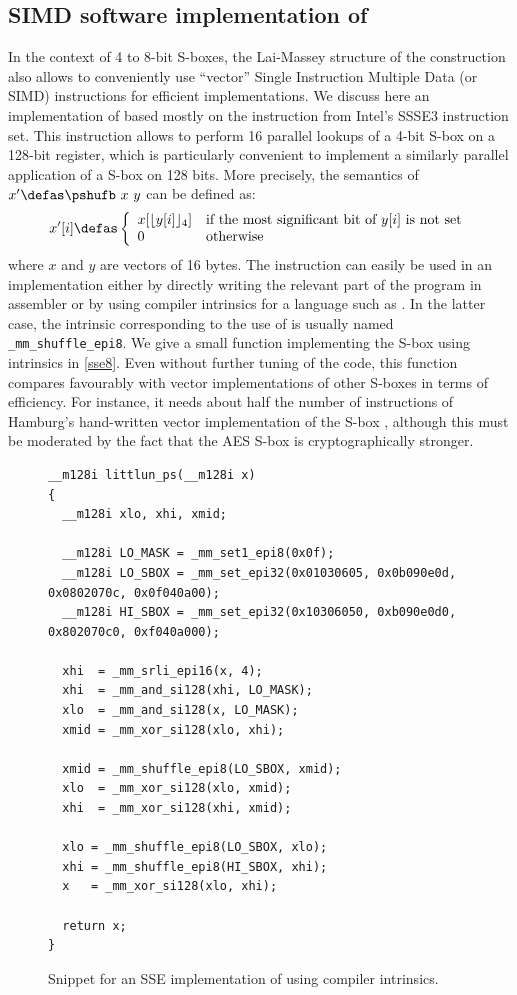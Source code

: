 \FloatBarrier

\subsection{SIMD software implementation of \littlunOne}
\label{sec:simdimplem}

In the context of 4 to 8-bit S-boxes, the Lai-Massey structure of the \littlun construction also allows to conveniently use ``vector'' Single Instruction Multiple Data (or SIMD) instructions for
efficient implementations. We discuss here an implementation of \littlunOne based mostly on the \pshufb instruction from Intel's SSSE3 instruction set. This instruction
allows to perform 16 parallel lookups of a 4-bit S-box on a 128-bit register, which is particularly convenient to implement a similarly parallel application of
a \littlun S-box on 128 bits. More precisely, the semantics of $x' \defas \pshufb~x~y$ can be defined as: 
\[
x'[i] \defas \left\{
				\begin{array}{ll}
				x[\lfloor y[i]\rfloor_4]  & \text{if the most significant bit of $y[i]$ is not set}\\
				0 & \text{otherwise}
				\end{array}
	    \right.
\]
where $x$ and $y$ are vectors of 16 bytes. The \pshufb instruction can easily be used in an implementation either by directly writing the relevant part of the program in assembler
or by using compiler intrinsics for a language such as \C. In the latter case, the intrinsic corresponding to the use of \pshufb is usually named \texttt{\_mm\_shuffle\_epi8}.
We give a small function implementing the \littlunOne S-box using \C intrinsics in \autoref{sse8}. Even without further tuning of the code, this function compares favourably with vector implementations
of other S-boxes in terms of efficiency. For instance, it needs about half the number of instructions of Hamburg's hand-written vector implementation of the \aes S-box \cite{vpaes}, although
this must be moderated by the fact that the AES S-box is cryptographically stronger.

\begin{figure}[ht]
\begin{verbatim}
__m128i littlun_ps(__m128i x)
{
  __m128i xlo, xhi, xmid;

  __m128i LO_MASK = _mm_set1_epi8(0x0f);
  __m128i LO_SBOX = _mm_set_epi32(0x01030605, 0x0b090e0d, 0x0802070c, 0x0f040a00);
  __m128i HI_SBOX = _mm_set_epi32(0x10306050, 0xb090e0d0, 0x802070c0, 0xf040a000);

  xhi  = _mm_srli_epi16(x, 4);
  xhi  = _mm_and_si128(xhi, LO_MASK);
  xlo  = _mm_and_si128(x, LO_MASK);
  xmid = _mm_xor_si128(xlo, xhi);

  xmid = _mm_shuffle_epi8(LO_SBOX, xmid);
  xlo  = _mm_xor_si128(xlo, xmid);
  xhi  = _mm_xor_si128(xhi, xmid);

  xlo = _mm_shuffle_epi8(LO_SBOX, xlo);
  xhi = _mm_shuffle_epi8(HI_SBOX, xhi);
  x   = _mm_xor_si128(xlo, xhi);

  return x;
}
\end{verbatim}
\caption{Snippet for an SSE \C implementation of \littlunOne using compiler intrinsics.\label{sse8}}
\end{figure}

